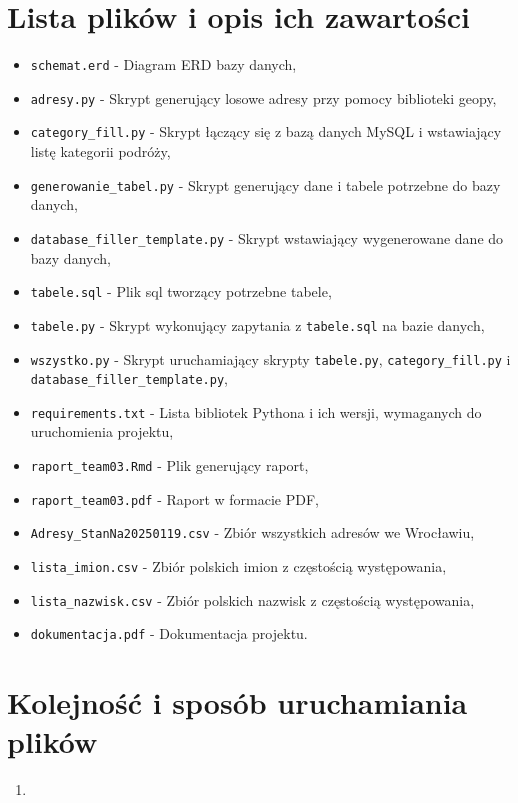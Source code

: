 \documentclass{article}
\begin{document}
\section{Lista plików i opis ich zawartości}
\begin{itemize}
    \item \texttt{schemat.erd} - Diagram ERD bazy danych,
    \item \texttt{adresy.py} - Skrypt generujący losowe adresy przy pomocy biblioteki geopy,
    \item \texttt{category\_fill.py} - Skrypt łączący się z bazą danych MySQL i wstawiający listę kategorii podróży,
    \item \texttt{generowanie\_tabel.py} - Skrypt generujący dane i tabele potrzebne do bazy danych,
    \item \texttt{database\_filler\_template.py} - Skrypt wstawiający wygenerowane dane do bazy danych,
    \item \texttt{tabele.sql} - Plik sql tworzący potrzebne tabele,
    \item \texttt{tabele.py} - Skrypt wykonujący zapytania z \texttt{tabele.sql} na bazie danych,
    \item \texttt{wszystko.py} - Skrypt uruchamiający skrypty \texttt{tabele.py}, \texttt{category\_fill.py} i \texttt{database\_filler\_template.py},
    \item \texttt{requirements.txt} - Lista bibliotek Pythona i ich wersji, wymaganych do uruchomienia projektu,
    \item \texttt{raport\_team03.Rmd} - Plik generujący raport,
    \item \texttt{raport\_team03.pdf} - Raport w formacie PDF,
    \item \texttt{Adresy\_StanNa20250119.csv} - Zbiór wszystkich adresów we Wrocławiu,
    \item \texttt{lista\_imion.csv} - Zbiór polskich imion z częstością występowania,
    \item \texttt{lista\_nazwisk.csv} - Zbiór polskich nazwisk z częstością występowania,
    \item \texttt{dokumentacja.pdf} - Dokumentacja projektu.
\end{itemize}

\section{Kolejność i sposób uruchamiania plików}
\begin{enumerate}
    \item 
\end{enumerate}
\end{document}
